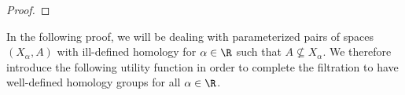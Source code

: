 \begin{proof}
\end{proof}


In the following proof, we will be dealing with parameterized pairs of spaces $(X_\alpha, A)$ with ill-defined homology for $\alpha\in\R$ such that $A\not\subseteq X_\alpha$.
We therefore introduce the following utility function in order to complete the filtration to have well-defined homology groups for all $\alpha\in\R$.


